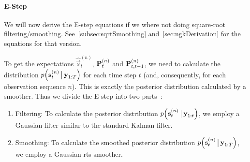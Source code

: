 	\paragraph{E-Step}
		We will now derive the E-step equations if we where not doing square-root filtering/smoothing. See~\autoref{subsec:sqrtSmoothing} and~\autoref{sec:ngkDerivation} for the equations for that version.

		To get the expectations \( \hat{\vec{s}}_t^{(n)} \), \( \boldsymbol{\mathrm{P}}_{t}^{(n)} \) and \( \boldsymbol{\mathrm{P}}_{t, t - 1}^{(n)} \), we need to calculate the distribution \( p\Big(\boldsymbol{\mathrm{s}}_t^{(n)} \,\big\vert\, \boldsymbol{\mathrm{y}}_{1:T}\Big) \) for each time step \(t\) (and, consequently, for each observation sequence \(n\)). This is exactly the posterior distribution calculated by a smoother. Thus we divide the E-step into two parts~\cite{minkaHiddenMarkovModels1999}:
		\begin{enumerate}
			\item Filtering: To calculate the posterior distribution \( p\Big(\boldsymbol{\mathrm{s}}_t^{(n)} \,\big\vert\, \boldsymbol{\mathrm{y}}_{1:t}\Big) \), we employ a Gaussian filter similar to the standard Kalman filter.
			\item Smoothing: To calculate the smoothed posterior distribution \( p\Big(\boldsymbol{\mathrm{s}}_t^{(n)} \,\big\vert\, \boldsymbol{\mathrm{y}}_{1:T}\Big) \), we employ a Gaussian \ac{rts} smoother.
		\end{enumerate}

